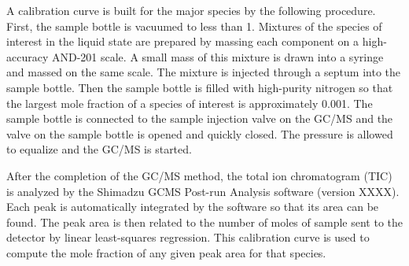 \documentclass[../main.tex]{subfiles}
\begin{document}
A calibration curve is built for the major species by the
following procedure. First, the sample bottle is vacuumed
to less than \SI{1}{\torr}. Mixtures of the species of
interest in the liquid state are prepared by massing each
component on a high-accuracy AND-201 scale. A small mass
of this mixture is drawn into a syringe and massed on the
same scale. The mixture is injected through a septum into
the sample bottle. Then the sample bottle is filled with
high-purity nitrogen so that the largest mole fraction of
a species of interest is approximately 0.001. The sample
bottle is connected to the sample injection valve on the
GC/MS and the valve on the sample bottle is opened and
quickly closed. The pressure is allowed to equalize and
the GC/MS is started.

After the completion of the GC/MS method, the total ion
chromatogram (TIC) is analyzed by the Shimadzu GCMS Post-run
Analysis software (version XXXX). Each peak is automatically
integrated by the software so that its area can be found.
The peak area is then related to the number of moles of
sample sent to the detector by linear least-squares regression.
This calibration curve is used to compute the mole fraction
of any given peak area for that species.
\end{document}
